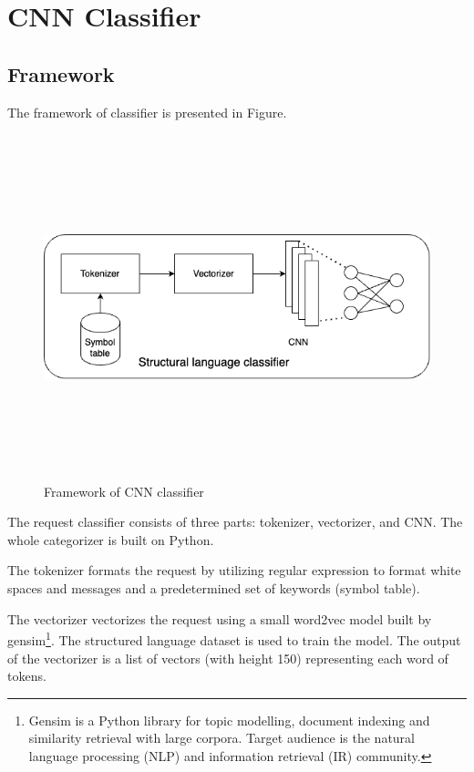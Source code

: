 \section{CNN Classifier}
\label{sec:cnn_classfier}

\subsection{Framework}
\hspace{0.5cm}The framework of classifier is presented in Figure.
\begin{figure}[!h]
	\centering
	\includegraphics[width=\linewidth, height=10cm,keepaspectratio]{figures/structural.png}
  \caption{Framework of CNN classifier}
\end{figure} 
The request classifier consists of three parts: tokenizer, vectorizer, and CNN. The whole categorizer is built on Python.

The tokenizer formats the request by utilizing regular expression to format white spaces and messages and a predetermined set of keywords (symbol table).

The vectorizer vectorizes the request using a small word2vec model built by gensim\footnote{Gensim is a Python library for topic modelling, document indexing and similarity retrieval with large corpora. Target audience is the natural language processing (NLP) and information retrieval (IR) community.}. The structured language dataset is used to train the model. The output of the vectorizer is a list of vectors (with height 150) representing each word of tokens.

